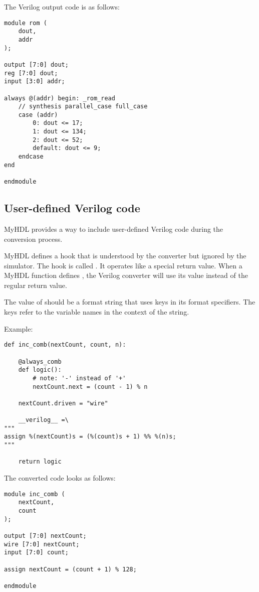 The Verilog output code is as follows:

\begin{verbatim}
module rom (
    dout,
    addr
);
                                                                                
output [7:0] dout;
reg [7:0] dout;
input [3:0] addr;
                                                                       
always @(addr) begin: _rom_read
    // synthesis parallel_case full_case
    case (addr)
        0: dout <= 17;
        1: dout <= 134;
        2: dout <= 52;
        default: dout <= 9;
    endcase
end
                                                                                
endmodule
\end{verbatim}

\subsection{User-defined Verilog code \label{conf-usage-custom}}

MyHDL provides a way  to include user-defined Verilog
code during the conversion process.

MyHDL defines a hook that is understood by the converter but ignored by
the simulator. The hook is called . It operates
like a special return value. When a MyHDL function defines
, the Verilog converter will use its value instead of the
regular return value.

The value of  should be a format string that uses keys in
its format specifiers. The keys refer to the variable names in the
context of the string.

Example:

\begin{verbatim}
def inc_comb(nextCount, count, n):

    @always_comb
    def logic():
        # note: '-' instead of '+'
        nextCount.next = (count - 1) % n

    nextCount.driven = "wire"

    __verilog__ =\
"""
assign %(nextCount)s = (%(count)s + 1) %% %(n)s;
"""

    return logic
\end{verbatim}

The converted code looks as follows:

\begin{verbatim}
module inc_comb (
    nextCount,
    count
);

output [7:0] nextCount;
wire [7:0] nextCount;
input [7:0] count;

assign nextCount = (count + 1) % 128;

endmodule
\end{verbatim}


